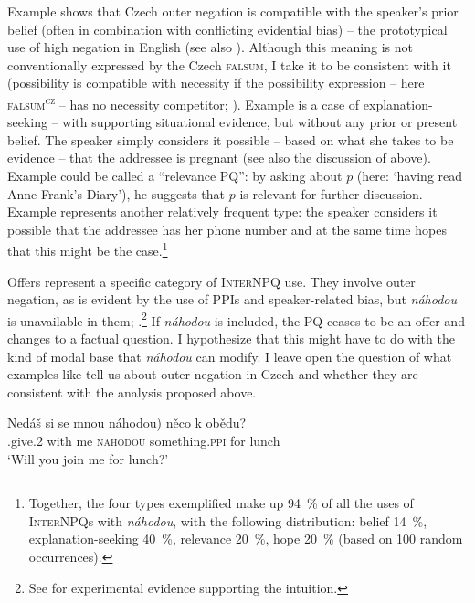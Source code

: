 \documentclass[output=paper,colorlinks,citecolor=brown]{langscibook}
\begin{document}
\noindent Example  shows that Czech outer negation is compatible with the speaker's prior belief (often in combination with conflicting evidential bias) -- the prototypical use of high negation in English (see also ). Although this meaning is not conventionally expressed by the Czech \textsc{falsum}, I take it to be consistent with it (possibility is compatible with necessity if the possibility expression -- here \textsc{falsum\textsuperscript{cz}} -- has no necessity competitor; \citealt{Deal2011}). Example  is a case of explanation-seeking -- with supporting situational evidence, but without any prior or present belief. The speaker simply considers it possible -- based on what she takes to be evidence -- that the addressee is pregnant (see also the discussion of  above). Example  could be called a ``relevance PQ'': by asking about $p$ (here: `having read Anne Frank's Diary'), he suggests that $p$ is relevant for further discussion. Example  represents another relatively frequent type: the speaker considers it possible that the addressee has her phone number and at the same time hopes that this might be the case.\footnote{Together, the four types exemplified make up \qty{94}{\percent} of all the uses of \textsc{InterNPQ}s with \textit{náhodou}, with the following distribution: belief \qty{14}{\percent}, explanation-seeking \qty{40}{\percent}, relevance \qty{20}{\percent}, hope \qty{20}{\percent} (based on 100 random occurrences).}

Offers represent a specific category of \textsc{InterNPQ} use. They involve outer negation, as is evident by the use of PPIs and speaker-related bias, but \textit{náhodou} is unavailable in them; .\footnote{See \citet{Chodounska.etal2025} for experimental evidence supporting the intuition.\label{sim:fn:chodounska1}} If \textit{náhodou} is included, the PQ ceases to be an offer and changes to a factual question. I hypothesize that this might have to do with the kind of modal base that \textit{náhodou} can modify. I leave open the question of what examples like  tell us about outer negation in Czech and whether they are consistent with the analysis proposed above.

\ea\gll Nedáš si se mnou \minsp{(\#} náhodou) něco k obědu?\label{sim:ex:offer}\\
{\NEG}.give.2{\SG} {\REFL} with me {} \textsc{nahodou} something.\textsc{ppi} for lunch\\
`Will you join me for lunch?'
\z
\end{document}

